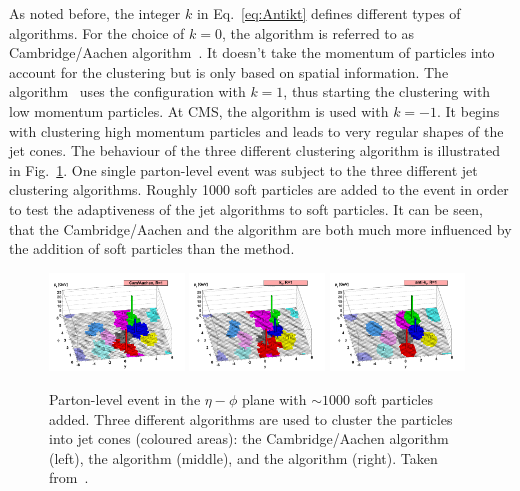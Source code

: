 As noted before, the integer $k$ in Eq.~\eqref{eq:Antikt} defines different types of algorithms.
For the choice of $k=0$, the algorithm is referred to as Cambridge/Aachen algorithm~\cite{bib:Cambridge_1997,bib:Cambridge_1998}.
It doesn't take the momentum of particles into account for the clustering but is only based on spatial information.
The \kt algorithm~\cite{bib:kT_algorithm_1993,bib:kT_algorithm_Ellis} uses the configuration with $k=1$, thus starting the clustering with low momentum particles.
At CMS, the \antikt algorithm is used with $k=-1$. 
It begins with clustering high momentum particles and leads to very regular shapes of the jet cones.
The behaviour of the three different clustering algorithm is illustrated in Fig.~\ref{fig:ClusteringAlgorithms}. 
One single parton-level event was subject to the three different jet clustering algorithms.
Roughly 1000 soft particles are added to the event in order to test the adaptiveness of the jet algorithms to soft particles.
It can be seen, that the Cambridge/Aachen and the \kt algorithm are both much more influenced by the addition of soft particles than the \antikt method.
\begin{figure}[!t]
  \centering
      \includegraphics[width=0.32\textwidth]{figures/experiment/ObjectReconstruction/herwig-parton-level-ev-cam.pdf}
      \includegraphics[width=0.32\textwidth]{figures/experiment/ObjectReconstruction/herwig-parton-level-ev-kt.pdf}
      \includegraphics[width=0.32\textwidth]{figures/experiment/ObjectReconstruction/herwig-parton-level-ev-antikt.pdf}
  \caption{Parton-level event in the $\eta - \phi$ plane with $\sim 1000$ soft particles added. Three different algorithms are used to cluster the particles into jet cones (coloured areas): the Cambridge/Aachen algorithm (left), the \kt algorithm (middle), and the \antikt algorithm (right). Taken from~\cite{bib:JetClustering_2008}.}  
  \label{fig:ClusteringAlgorithms}
\end{figure}

